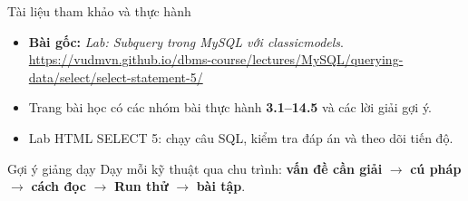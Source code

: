 \documentclass[aspectratio=169,10pt]{beamer}
\newcommand{\sourceurl}{\url{https://vudmvn.github.io/dbms-course/lectures/MySQL/querying-data/select/select-statement-5/}}
\begin{document}
\begin{frame}[fragile]{Tài liệu tham khảo và thực hành}
\begin{itemize}
\item \textbf{Bài gốc:} \emph{Lab: Subquery trong MySQL với classicmodels}.\\
{\footnotesize\sourceurl}
\item Trang bài học có các nhóm bài thực hành \textbf{3.1--14.5} và các lời giải gợi ý.
\item Lab HTML SELECT 5: chạy câu SQL, kiểm tra đáp án và theo dõi tiến độ.
\end{itemize}
\vspace{.7em}
\begin{block}{Gợi ý giảng dạy}
Dạy mỗi kỹ thuật qua chu trình: \textbf{vấn đề cần giải} $\rightarrow$ \textbf{cú pháp} $\rightarrow$ \textbf{cách đọc} $\rightarrow$ \textbf{Run thử} $\rightarrow$ \textbf{bài tập}. 
\end{block}
\end{frame}
\end{document}
